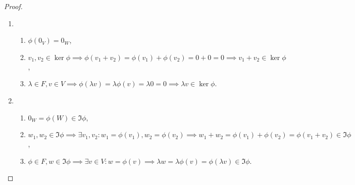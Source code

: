\begin{proof}~
    \begin{enumerate}
    \item 
        \begin{enumerate}
        \item $\phi(0_V) = 0_W$,
        \item $v_1, v_2 \in \ker \phi \implies \phi(v_1 + v_2) = \phi(v_1) + \phi(v_2) = 0 + 0 = 0 \implies v_1 + v_2 \in \ker \phi$,
        \item $\lambda \in F, v \in V \implies \phi(\lambda v) = \lambda \phi(v) = \lambda 0 = 0 \implies \lambda v \in \ker \phi$.
        \end{enumerate}

    \item
        \begin{enumerate}
        \item $0_W = \phi(W) \in \Im \phi$,
        \item $w_1, w_2 \in \Im \phi \implies \exists v_1, v_2 : w_1 = \phi(v_1), w_2 = \phi(v_2) \implies w_1 + w_2 = \phi(v_1) + \phi(v_2) = \phi(v_1 + v_2) \in \Im \phi$,
        \item $\phi \in F, w \in \Im \phi \implies \exists v \in V : w = \phi(v) \implies \lambda w = \lambda \phi(v) = \phi(\lambda v) \in \Im \phi$.
            \qedhere
        \end{enumerate}
    \end{enumerate}
\end{proof}
